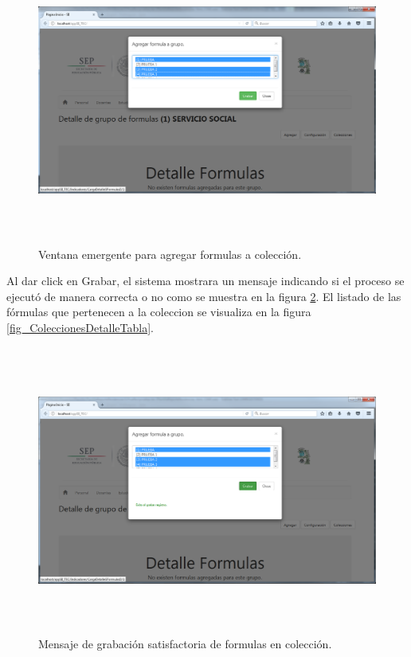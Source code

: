 		    	\begin{figure}[]
			        \centering
			        \includegraphics[width=16cm, height=9.5cm]{figuras/ColeccionesDetalleAgregar}
			        \caption{Ventana emergente para agregar formulas a colecci\'on.}
			        \label{fig_ColeccionesDetalleAgregar}
			    \end{figure}

			    Al dar click en Grabar, el sistema mostrara un mensaje indicando si el proceso se ejecut\'o de manera correcta o no como se muestra en la figura \ref{fig_ColeccionesDetalleGrabar}. El listado de las f\'ormulas que pertenecen a la coleccion se visualiza en la figura \ref{fig_ColeccionesDetalleTabla}.

			    \begin{figure}[]
			        \centering
			        \includegraphics[width=16cm, height=9.5cm]{figuras/ColeccionesDetalleGrabar}
			        \caption{Mensaje de grabaci\'on satisfactoria de formulas en colecci\'on.}
			        \label{fig_ColeccionesDetalleGrabar}
			    \end{figure}

